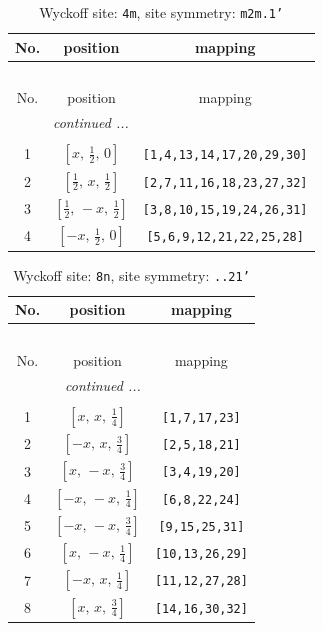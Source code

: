 \documentclass[fleqn,8pt]{jsarticle}
\begin{document}
\renewcommand{\arraystretch}{1.2}
\begin{longtable}{ccc}
\caption{Wyckoff site: {\tt 4m}, site symmetry: {\tt m2m.1'}}
 \\
 \hline \hline
No. & position & mapping \\ \hline \endfirsthead

\multicolumn{2}{l}{\tablename\ \thetable{}} \\
 \hline \hline
No. & position & mapping \\ \hline \endhead

 \hline \hline
\multicolumn{2}{r}{\footnotesize\it continued ...} \\ \endfoot

 \hline \hline
\multicolumn{2}{r}{} \\ \endlastfoot

1 & $\left[ x,\, \frac{1}{2},\, 0 \right]$ & {\tt [1,4,13,14,17,20,29,30]} \\ \hline
2 & $\left[ \frac{1}{2},\, x,\, \frac{1}{2} \right]$ & {\tt [2,7,11,16,18,23,27,32]} \\ \hline
3 & $\left[ \frac{1}{2},\, - x,\, \frac{1}{2} \right]$ & {\tt [3,8,10,15,19,24,26,31]} \\ \hline
4 & $\left[ - x,\, \frac{1}{2},\, 0 \right]$ & {\tt [5,6,9,12,21,22,25,28]} \\
\end{longtable}
\renewcommand{\arraystretch}{1.2}
\begin{longtable}{ccc}
\caption{Wyckoff site: {\tt 8n}, site symmetry: {\tt ..21'}}
 \\
 \hline \hline
No. & position & mapping \\ \hline \endfirsthead

\multicolumn{2}{l}{\tablename\ \thetable{}} \\
 \hline \hline
No. & position & mapping \\ \hline \endhead

 \hline \hline
\multicolumn{2}{r}{\footnotesize\it continued ...} \\ \endfoot

 \hline \hline
\multicolumn{2}{r}{} \\ \endlastfoot

1 & $\left[ x,\, x,\, \frac{1}{4} \right]$ & {\tt [1,7,17,23]} \\ \hline
2 & $\left[ - x,\, x,\, \frac{3}{4} \right]$ & {\tt [2,5,18,21]} \\ \hline
3 & $\left[ x,\, - x,\, \frac{3}{4} \right]$ & {\tt [3,4,19,20]} \\ \hline
4 & $\left[ - x,\, - x,\, \frac{1}{4} \right]$ & {\tt [6,8,22,24]} \\ \hline
5 & $\left[ - x,\, - x,\, \frac{3}{4} \right]$ & {\tt [9,15,25,31]} \\ \hline
6 & $\left[ x,\, - x,\, \frac{1}{4} \right]$ & {\tt [10,13,26,29]} \\ \hline
7 & $\left[ - x,\, x,\, \frac{1}{4} \right]$ & {\tt [11,12,27,28]} \\ \hline
8 & $\left[ x,\, x,\, \frac{3}{4} \right]$ & {\tt [14,16,30,32]} \\
\end{longtable}
\end{document}
